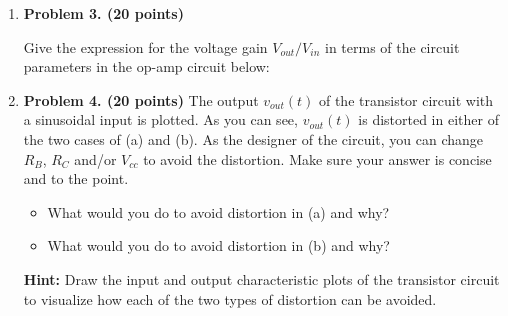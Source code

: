 \begin{enumerate}


\item {\bf Problem 3. (20 points)} 

  Give the expression for the voltage gain $V_{out}/V_{in}$ in terms of 
  the circuit parameters in the op-amp circuit below:


%


\item {\bf Problem 4. (20 points)} 
The output $v_{out}(t)$ of the transistor circuit with a sinusoidal 
input is plotted. As you can see, $v_{out}(t)$ is distorted in either 
of the two cases of (a) and (b). As the designer of the circuit, you 
can change $R_B$, $R_C$ and/or $V_{cc}$ to avoid the distortion. Make
sure your answer is concise and to the point.



\begin{itemize}
\item What would you do to avoid distortion in (a) and why? 
\item What would you do to avoid distortion in (b) and why? 
\end{itemize}


{\bf Hint:} Draw the input and output characteristic plots of the transistor
circuit to visualize how each of the two types of distortion can be avoided.






\end{enumerate}
